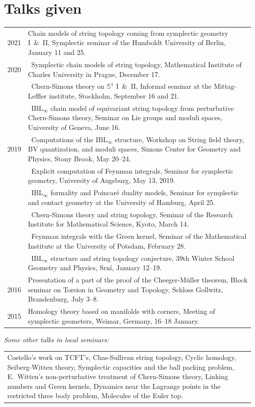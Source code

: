 \documentclass[a4paper,12pt]{article}
\begin{document}
\section*{Talks given}
%
\begin{tabularx}{\textwidth}{@{}lX@{}}
2021		&	Chain models of string topology coming from symplectic geometry I~\&~II, Symplectic seminar of the Humboldt University of Berlin, January 11 and 25.\\
2020 		&	\textbullet~Symplectic chain models of string topology, Mathematical Institute of Charles University in Prague, December 17.\\
		&	\textbullet~Chern-Simons theory on $\mathbb{S}^1$ I~\&~II, Informal seminar at the Mittag-Leffler institute, Stockholm, September 16 and 21.\\
		&	\textbullet~$\mathrm{IBL}_\infty$ chain model of equivariant string topology from perturbative Chern-Simons theory, Seminar on Lie groups and moduli spaces, University of Geneva, June 16.\\
2019 		&  	\textbullet~Computations of the $\mathrm{IBL}_\infty$ structure, Workshop on String field theory, BV quantization, and moduli spaces, Simons Center for Geometry and Physics, Stony Brook, May 20--24.\\
		& 	\textbullet~Explicit computation of Feynman integrals, Seminar for symplectic geometry, University of Augsburg, May 13, 2019.\\
		& 	\textbullet~$\mathrm{IBL}_\infty$ formality and Poincar\'e duality models, Seminar for symplectic and contact geometry at the University of Hamburg, April 25.\\
		& 	\textbullet~Chern-Simons theory and string topology, Seminar of the Research Institute for Mathematical Science, Kyoto, March 14.\\
		& 	\textbullet~Feynman integrals with the Green kernel, Seminar of the Mathematical Institute at the University of Potsdam, February 28.\\
		& 	\textbullet~$\mathrm{IBL}_\infty$ structure and string topology conjecture, 39th Winter School Geometry and Physics, Srn\'i, January 12--19.\\
2016 		& 	Presentation of a part of the proof of the Cheeger-M\"uller theorem, Block seminar on Torsion in Geometry and Topology, Schloss Gollwitz, Brandenburg, July 3--8.\\
2015 		& 	Homology theory based on manifolds with corners,  Meeting of symplectic geometers, Weimar, Germany, 16--18 January.
\end{tabularx}
%
\emph{Some other talks in local seminars:}
\medskip
\begin{tabularx}{\textwidth}{@{}X@{}}
Costello's work on TCFT's, Chas-Sullivan string topology, Cyclic homology, Seiberg-Witten theory, Symplectic capacities and the ball packing problem, E.~Witten's non-perturbative treatment of Chern-Simons theory, Linking numbers and Green kernels, Dynamics near the Lagrange points in the restricted three body problem, Molecules of the Euler top.
\end{tabularx}
%
\end{document}
